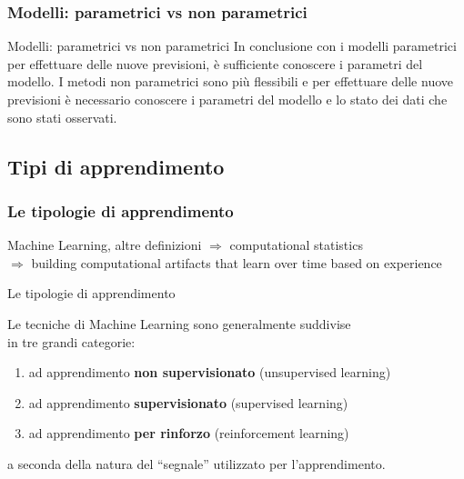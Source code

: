 {\begin{frame}

	\frametitle{Modelli: parametrici vs non parametrici}

	\begin{block}{Modelli: parametrici vs non parametrici}
		In conclusione con i modelli parametrici per effettuare delle nuove previsioni, è sufficiente conoscere i parametri del modello.
		\newlinedouble
		I metodi non parametrici sono più flessibili e per effettuare delle nuove previsioni è necessario conoscere i parametri del modello e lo stato dei dati che sono stati osservati.
	\end{block}

\end{frame}
}





\subsection[Tipi di apprendimento]{Tipi di apprendimento}
\begin{frame}

	\frametitle{Le tipologie di apprendimento}

	\begin{block}{Machine Learning, altre definizioni}
		$\Rightarrow$ computational statistics\\
		$\Rightarrow$ building computational artifacts that learn over time based on experience
	\end{block}

	\begin{block}{Le tipologie di apprendimento}

		Le tecniche di Machine Learning sono generalmente suddivise\\
		in tre grandi categorie:

		\begin{enumerate}
			\item ad apprendimento \textbf{non supervisionato} (unsupervised learning)
			\item ad apprendimento \textbf{supervisionato} (supervised learning)
			\item ad apprendimento \textbf{per rinforzo} (reinforcement learning)
		\end{enumerate}

		a seconda della natura del ``segnale'' utilizzato per l'apprendimento.
	\end{block}


\end{frame}


